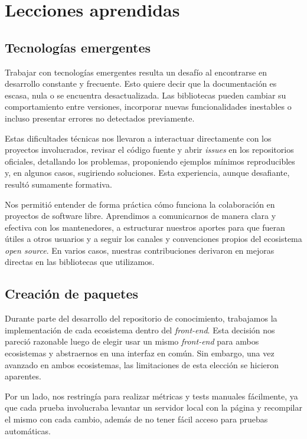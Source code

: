 \section{Lecciones aprendidas}

\subsection{Tecnologías emergentes}

Trabajar con tecnologías emergentes resulta un desafío al encontrarse en desarrollo constante y frecuente. Esto quiere decir que la documentación es escasa, nula o se encuentra desactualizada. Las bibliotecas pueden cambiar su comportamiento entre versiones, incorporar nuevas funcionalidades inestables o incluso presentar errores no detectados previamente.

Estas dificultades técnicas nos llevaron a interactuar directamente con los proyectos involucrados, revisar el código fuente y abrir \textit{issues} en los repositorios oficiales, detallando los problemas, proponiendo ejemplos mínimos reproducibles y, en algunos casos, sugiriendo soluciones. Esta experiencia, aunque desafiante, resultó sumamente formativa.

Nos permitió entender de forma práctica cómo funciona la colaboración en proyectos de software libre. Aprendimos a comunicarnos de manera clara y efectiva con los mantenedores, a estructurar nuestros aportes para que fueran útiles a otros usuarios y a seguir los canales y convenciones propios del ecosistema \textit{open source}. En varios casos, nuestras contribuciones derivaron en mejoras directas en las bibliotecas que utilizamos.

\subsection{Creación de paquetes}
Durante parte del desarrollo del repositorio de conocimiento, trabajamos la implementación de cada ecosistema dentro del \textit{front-end}. Esta decisión nos pareció razonable luego de elegir usar un mismo \textit{front-end} para ambos ecosistemas y abstraernos en una interfaz en común. Sin embargo, una vez avanzado en ambos ecosistemas, las limitaciones de esta elección se hicieron aparentes.

Por un lado, nos restringía para realizar métricas y tests manuales fácilmente, ya que cada prueba involucraba levantar un servidor local con la página y recompilar el mismo con cada cambio, además de no tener fácil acceso para pruebas automáticas.

